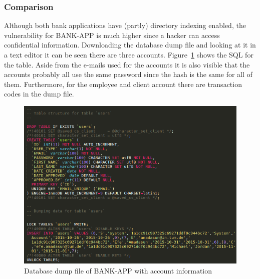 \subsubsection{Comparison}
Although both bank applications have (partly) directory indexing enabled, the vulnerability for BANK-APP is much higher since a hacker can access confidential information. Downloading the database dump file and looking at it in a text editor it can be seen there are three accounts. Figure~\ref{fig:db_dump} shows the SQL for the  table. Aside from the e-mails used for the accounts it is also visible that the accounts probably all use the same password since the hash is the same for all of them. Furthermore, for the employee and client account there are transaction codes in the dump file.

\begin{figure}[ht]
	\centering
	\includegraphics[width=.8\linewidth]{figures/OTG-AUTHZ-001.png}
	\caption{Database dump file of BANK-APP with account information}
	\label{fig:db_dump}
\end{figure}

\clearpage